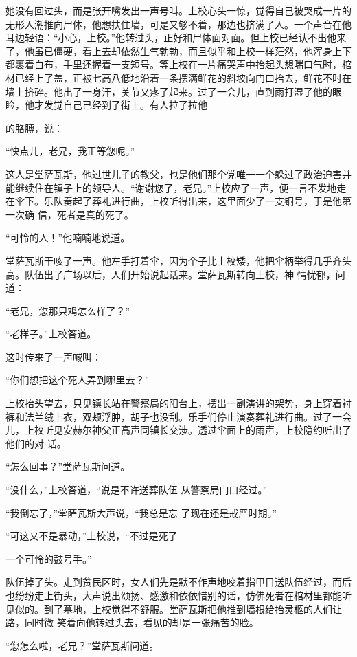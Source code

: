 \documentclass{article}
\begin{document}
她没有回过头，而是张开嘴发出一声号叫。上校心头一惊，觉得自己被哭成一片的无形人潮推向尸体，他想扶住墙，可是又够不着，那边也挤满了人。一个声音在他耳边轻语：“小心，上校。”他转过头，正好和尸体面对面。但上校已经认不出他来了，他虽已僵硬，看上去却依然生气勃勃，而且似乎和上校一样茫然，他浑身上下都裹着白布，手里还握着一支短号。等上校在一片痛哭声中抬起头想喘口气时，棺材已经上了盖，正被七高八低地沿着一条摆满鲜花的斜坡向门口抬去，鲜花不时在墙上挤碎。他出了一身汗，关节又疼了起来。过了一会儿，直到雨打湿了他的眼睑，他才发觉自己已经到了街上。有人拉了拉他

\newpage
的胳膊，说： 


“快点儿，老兄，我正等您呢。” 

这人是堂萨瓦斯，他过世儿子的教父，也是他们那个党唯一一个躲过了政治迫害并能继续住在镇子上的领导人。“谢谢您了，老兄。”上校应了一声，便一言不发地走在伞下。乐队奏起了葬礼进行曲，上校听得出来，这里面少了一支铜号，于是他第一次确
信，死者是真的死了。 


“可怜的人！”他喃喃地说道。 

堂萨瓦斯干咳了一声。他左手打着伞，因为个子比上校矮，他把伞柄举得几乎齐头高。队伍出了广场以后，人们开始说起话来。堂萨瓦斯转向上校，神
情忧郁，问道： 


“老兄，您那只鸡怎么样了？” 


“老样子。”上校答道。 

\newpage


这时传来了一声喊叫： 


“你们想把这个死人弄到哪里去？” 

上校抬头望去，只见镇长站在警察局的阳台上，摆出一副演讲的架势，身上穿着衬裤和法兰绒上衣，双颊浮肿，胡子也没刮。乐手们停止演奏葬礼进行曲。过了一会儿，上校听见安赫尔神父正高声同镇长交涉。透过伞面上的雨声，上校隐约听出了他们的对
话。 


“怎么回事？”堂萨瓦斯问道。 

“没什么，”上校答道，“说是不许送葬队伍
从警察局门口经过。” 

“我倒忘了，”堂萨瓦斯大声说，“我总是忘
了现在还是戒严时期。” 

“可这又不是暴动，”上校说，“不过是死了

\newpage
一个可怜的鼓号手。” 

队伍掉了头。走到贫民区时，女人们先是默不作声地咬着指甲目送队伍经过，而后也纷纷走上街头，大声说出颂扬、感激和依依惜别的话，仿佛死者在棺材里都能听见似的。到了墓地，上校觉得不舒服。堂萨瓦斯把他推到墙根给抬灵柩的人们让路，同时微
笑着向他转过头去，看见的却是一张痛苦的脸。 


“您怎么啦，老兄？”堂萨瓦斯问道。 
\end{document}
